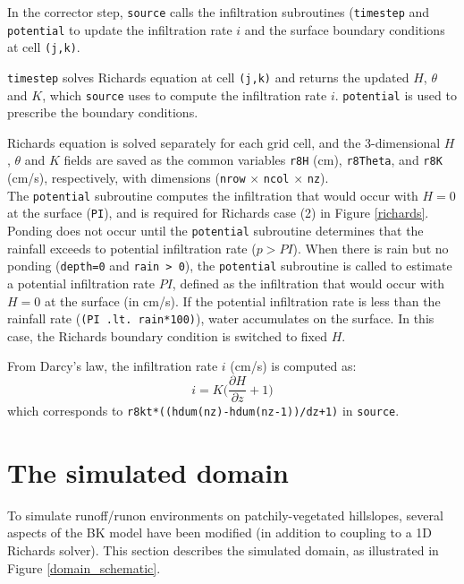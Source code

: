 \documentclass{article}
\newcommand{\code}[1]{\texttt{#1}}
\begin{document}
In the corrector step, \code{source} calls the infiltration subroutines (\code{timestep} and \code{potential} to update the infiltration rate $i$ and the surface boundary conditions at cell \code{(j,k)}. 

\code{timestep} solves Richards equation at cell \code{(j,k)} and returns the updated $H$, $\theta$ and $K$, which \code{source} uses to compute the infiltration rate $i$. \code{potential} is used to prescribe the boundary conditions. 

Richards equation  is solved separately for each grid cell, and the 3-dimensional $H$, $\theta$ and $K$  fields are saved as the common variables \code{r8H} (cm), \code{r8Theta}, and  \code{r8K} (cm/s), respectively, with dimensions (\code{nrow} $\times$ \code{ncol} $\times$ \code{nz}).\\ 

The \code{potential} subroutine computes the infiltration that would occur with $H=0$ at the surface (\code{PI}), and is required for Richards case (2) in Figure \ref{richards}. Ponding does not occur until the \code{potential} subroutine determines that the rainfall exceeds to potential infiltration rate ($p>PI$). 	 When there is rain but no ponding (\code{depth=0} and \code{rain > 0}), the  \code{potential} subroutine is called to estimate a potential infiltration rate $PI$, defined as the infiltration that would occur with $H=0$ at the surface (in cm/s).   If the potential infiltration rate is less than the rainfall rate (\code{(PI .lt. rain*100)}), water accumulates on the surface.  In this case, the Richards boundary condition is switched to fixed $H$.	

\noindent From Darcy's law, the infiltration rate $i$ (cm/s) is computed as:
$$ i =  K \bigg(\frac{\partial H}{\partial z} + 1\bigg ) $$
which corresponds to \code{r8kt*((hdum(nz)-hdum(nz-1))/dz+1)} in \code{source}.


		




	
\section{The simulated domain}
\label{domain}
To simulate runoff/runon environments on patchily-vegetated hillslopes, several aspects of the BK model have been modified (in addition to coupling to a 1D Richards solver).  This section describes the simulated domain, as illustrated in Figure \ref{domain_schematic}.
\end{document}

